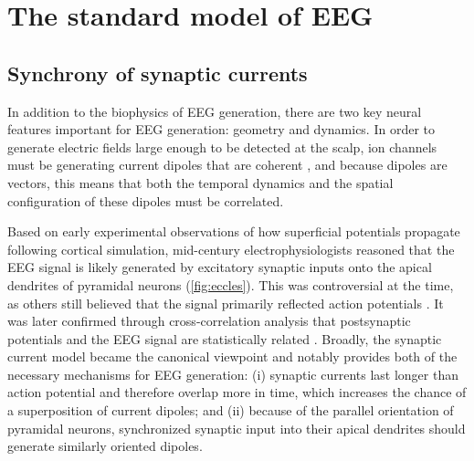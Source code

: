 \section{The standard model of EEG} \label{sec:standard_model}

\subsection{Synchrony of synaptic currents}
In addition to the biophysics of EEG generation, there are two key neural features important for EEG generation: geometry and dynamics. In order to generate electric fields large enough to be detected at the scalp, ion channels must be generating current dipoles that are coherent \cite{Buzsaki2012, Nunez2006}, and because dipoles are vectors, this means that both the temporal dynamics and the spatial configuration of these dipoles must be correlated.

Based on early experimental observations of how superficial potentials propagate following cortical simulation, mid-century electrophysiologists \cite{Eccles1951} reasoned that the EEG signal is likely generated by excitatory synaptic inputs onto the apical dendrites of pyramidal neurons (\autoref{fig:eccles}). This was controversial at the time, as others still believed that the signal primarily reflected action potentials \cite{Burns1950}. It was later confirmed through cross-correlation analysis that postsynaptic potentials and the EEG signal are statistically related \cite{KLEE1965}. Broadly, the synaptic current model became the canonical viewpoint and notably provides both of the necessary mechanisms for EEG generation: (i) synaptic currents last longer than action potential and therefore overlap more in time, which increases the chance of a superposition of current dipoles; and (ii) because of the parallel orientation of pyramidal neurons, synchronized synaptic input into their apical dendrites should generate similarly oriented dipoles.

